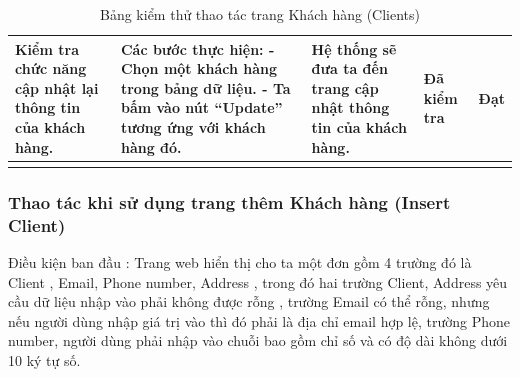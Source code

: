 \documentclass{article}
\begin{document}
\begin{longtable}{ | p{} |p{} | p{}  | p{}  | p{}  | }
\hline
Kiểm tra chức năng cập nhật lại thông tin của khách hàng. &
Các bước thực hiện: \newline
- Chọn một khách hàng trong bảng dữ liệu.  \newline
- Ta bấm vào nút “Update” tương ứng với khách hàng đó. 
&
Hệ thống sẽ đưa ta đến trang cập nhật thông tin của khách hàng. &
Đã kiểm tra &
Đạt \\

\hline
\caption{Bảng kiểm thử thao tác trang Khách hàng (Clients)}
\end{longtable}

\subsubsection{Thao tác khi sử dụng trang thêm Khách hàng  (Insert Client) }
Điều kiện ban đầu : Trang web hiển thị cho ta một đơn gồm 4 trường đó là Client , Email, Phone number, Address , trong đó hai trường Client, Address yêu cầu dữ liệu nhập vào phải không được rỗng , trường Email có thể rỗng, nhưng nếu người dùng nhập giá trị vào thì đó phải là địa chỉ email hợp lệ, trường Phone number, người dùng phải nhập vào chuỗi bao gồm chỉ số và có độ dài không dưới 10 ký tự số. \newline
\end{document}
